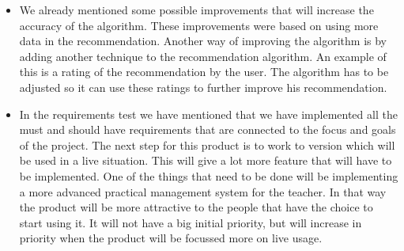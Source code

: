 \begin{itemize}
\item We already mentioned some possible improvements that will increase the accuracy of the algorithm.
These improvements were based on using more data in the recommendation.
Another way of improving the algorithm is by adding another technique to the recommendation algorithm.
An example of this is a rating of the recommendation by the user.
The algorithm has to be adjusted so it can use these ratings to further improve his recommendation.

\item In the requirements test we have mentioned that we have implemented all the must and should have requirements that are connected to the focus and goals of the project.
The next step for this product is to work to version which will be used in a live situation.
This will give a lot more feature that will have to be implemented.
One of the things that need to be done will be implementing a more advanced practical management system for the teacher.
In that way the product will be more attractive to the people that have the choice to start using it.
It will not have a big initial priority, but will increase in priority when the product will be focussed more on live usage.
\end{itemize}




